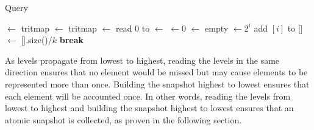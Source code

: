  
\begin{algorithm}[h]
\caption{Query} \label{alg:sl_query}
\begin{algorithmic}[1]
\setcounter{ALG@line}{\value{mycounter}}
    \State {} $\gets$ tritmap \label{Line:read_current_stream}
     \label{Line:check_rho}
        \State {} \label{Line:query_from_cache}
    \EndIf
    \Repeat \label{Line:start_collect_levels}
        \State {} $\gets$ tritmap
        \State {} $\gets$ read  $0$ to  \label{Line: read_snap}
        \State {} $\gets$  \label{Line: second-collect}
      \label{Line:query_linearization}
    \State {} $\gets 0$ \label{line: query_estimate_start}
    \State {} $\gets$ empty 
     \label{Line:start_collect_snapshot}
        \State {} $\gets 2^i $
         \label{Line:add_to_snapshot}
            \State add $[i]$ to  \label{Line:add_level_to_snapshot}
            \State {}[] $\gets$ [].size()$ / k$  \label{Line:update_myTrit} \label{line: query_estimate_end}
                \State \textbf{break}
            \EndIf
        \EndIf
    \EndFor \label{line:snapshot_done}
    \State {} \label{Line:query_result}
\EndProcedure
\setcounter{mycounter}{\value{ALG@line}}
\end{algorithmic}
\end{algorithm}


As levels propagate from lowest to highest, reading the levels in the same direction ensures that no element would be missed but may cause elements to be represented more than once. Building the snapshot highest to lowest ensures that each element will be accounted once. 
In other words, reading the levels from lowest to highest and building the snapshot highest to lowest ensures that an atomic snapshot is collected, as proven in the following section. 


